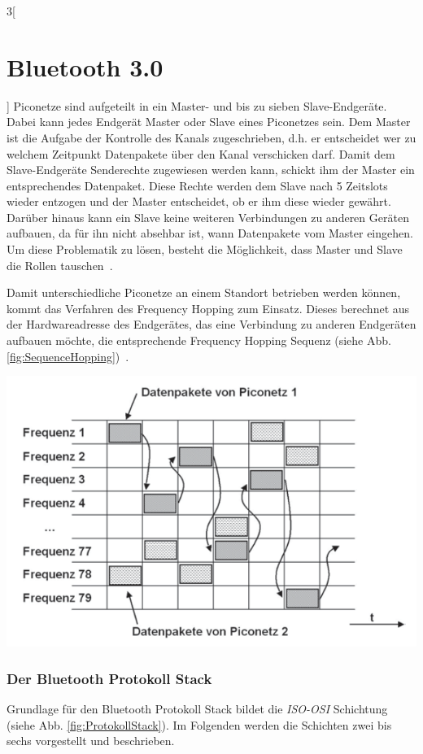 \begin{multicols}{3}[\section{Bluetooth 3.0}]
\noindent
Piconetze sind aufgeteilt in ein Master- und bis zu sieben Slave-Endgeräte. Dabei kann jedes Endgerät Master oder Slave eines Piconetzes sein. Dem Master ist die Aufgabe der Kontrolle des Kanals zugeschrieben, d.h. er entscheidet wer zu welchem Zeitpunkt Datenpakete über den Kanal verschicken darf. Damit dem Slave-Endgeräte Senderechte zugewiesen werden kann, schickt ihm der Master ein entsprechendes Datenpaket. Diese Rechte werden dem Slave nach 5 Zeitslots wieder entzogen und der Master entscheidet, ob er ihm diese wieder gewährt. Darüber hinaus kann ein Slave keine weiteren Verbindungen zu anderen Geräten aufbauen, da für ihn nicht absehbar ist, wann Datenpakete vom Master eingehen. Um diese Problematik zu lösen, besteht die Möglichkeit, dass Master und Slave die Rollen tauschen~\cite{bluetooth3.0.1}.

Damit unterschiedliche Piconetze an einem Standort betrieben werden können, kommt das Verfahren des Frequency Hopping zum Einsatz. Dieses berechnet aus der Hardwareadresse des Endgerätes, das eine Verbindung zu anderen Endgeräten aufbauen möchte, die entsprechende Frequency Hopping Sequenz (siehe Abb. \ref{fig:SequenceHopping})~\cite{bluetooth3.0.3}.

\begin{Figure}
\includegraphics[width=\linewidth]{Kapitel/Bluetooth3.0/Grafiken/frequencehopping.png}
\label{fig:SequenceHopping}
\end{Figure}

\subsubsection*{Der Bluetooth Protokoll Stack}
Grundlage für den Bluetooth Protokoll Stack bildet die \textit{ISO-OSI} Schichtung (siehe Abb. \ref{fig:ProtokollStack}). Im Folgenden werden die Schichten zwei bis sechs vorgestellt und beschrieben.


\end{multicols}
